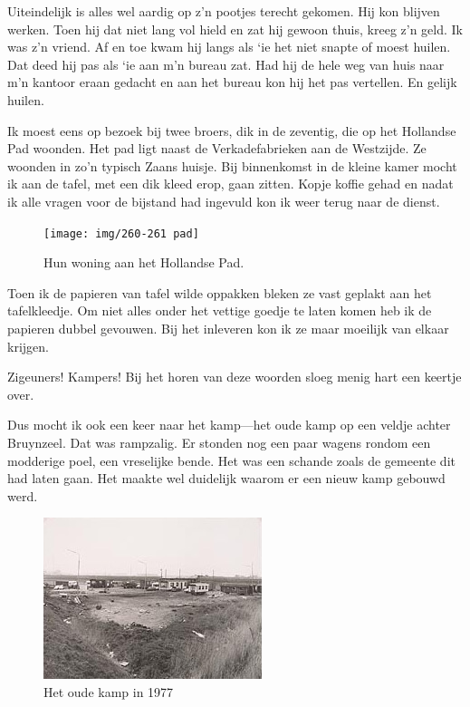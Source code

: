 \documentclass[10pt,twoside, openright]{memoir}
\begin{document}
Uiteindelijk is alles wel aardig op z’n pootjes terecht gekomen. Hij kon blijven werken. Toen hij dat niet lang vol hield en zat hij gewoon thuis, kreeg z’n geld. Ik was z’n vriend. Af en toe kwam hij langs als `ie het niet snapte of moest huilen. Dat deed hij pas als `ie aan m’n bureau zat. Had hij de hele weg van huis naar m’n kantoor eraan gedacht en aan het bureau kon hij het pas vertellen. En gelijk huilen.

Ik moest eens op bezoek bij twee broers, dik in de zeventig, die op het Hollandse Pad woonden. Het pad ligt naast de Verkadefabrieken aan de Westzijde. Ze woonden in zo’n typisch Zaans huisje. Bij binnenkomst in de kleine kamer mocht ik aan de tafel, met een dik kleed erop, gaan zitten. Kopje koffie gehad en nadat ik alle vragen voor de bijstand had ingevuld kon ik weer terug naar de dienst. 

\begin{figure}
\texttt{[image: img/260-261 pad]}
\caption*{\footnotesize Hun woning aan het Hollandse Pad.}
\end{figure}

Toen ik de papieren van tafel wilde oppakken bleken ze vast geplakt aan het tafelkleedje. Om niet alles onder het vettige goedje te laten komen heb ik de papieren dubbel gevouwen. Bij het inleveren kon ik ze maar moeilijk van elkaar krijgen.	

Zigeuners! Kampers! Bij het horen van deze woorden sloeg menig hart een keertje over. 

Dus mocht ik ook een keer naar het kamp---het oude kamp op een veldje achter Bruynzeel. Dat was rampzalig. Er stonden nog een paar wagens rondom een modderige poel, een vreselijke bende. Het was een schande zoals de gemeente dit had laten gaan. Het maakte wel duidelijk waarom er een nieuw kamp gebouwd werd. 

\begin{figure}
\includegraphics[width=\textwidth]{img/ch42/woonwagenkamp1977}
\caption*{\footnotesize Het oude kamp in 1977}
\end{figure}
\end{document}
